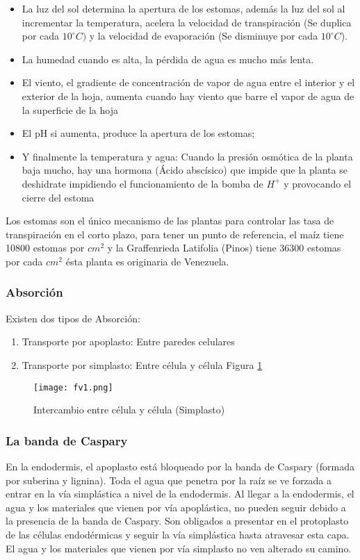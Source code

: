 \begin{itemize}
    \item La luz del sol determina la apertura de los estomas, además la luz del sol al incrementar la temperatura, acelera la velocidad de transpiración (Se duplica por cada $10^{\circ}C)$ y la velocidad de evaporación (Se disminuye por cada $10^{\circ}C$).
    \item La humedad cuando es alta, la pérdida de agua es mucho más lenta.
    \item El viento, el gradiente de concentración de vapor de agua entre el interior y el exterior de la hoja, aumenta cuando hay viento que barre el vapor de agua de la superficie de la hoja
    \item El pH si aumenta, produce la apertura de los estomas;
    \item Y finalmente la temperatura y agua: Cuando la presión osmótica de la planta baja mucho, hay una hormona (Ácido abscísico) 
    que impide que la planta se deshidrate impidiendo el funcionamiento de la bomba de $H^+$ y provocando el cierre del estoma
\end{itemize}

Los estomas son el único mecanismo de las plantas para controlar las tasa de transpiración en el corto plazo,
para tener un punto de referencia, el maíz tiene 10800 estomas por $cm^2$ y la Graffenrieda Latifolia (Pinos) tiene 36300 estomas por cada $cm^2$ ésta planta es originaria de Venezuela.
\subsubsection{Absorción}
Existen dos tipos de Absorción:

\begin{enumerate}
    \item Transporte por apoplasto: Entre paredes celulares
    \item Transporte por simplasto: Entre célula y célula Figura \ref{fav1}
\end{enumerate}

\begin{figure}[h!]
  \centerline{\texttt{[image: fv1.png]}}
  \caption{Intercambio entre célula y célula (Simplasto)}
  \label{fav1}
\end{figure}

\subsubsection{La banda de Caspary}
En la endodermis, el apoplasto está bloqueado por la banda de Caspary (formada por suberina y lignina). Toda el agua que penetra por la raíz se ve forzada a entrar en la vía simplástica a nivel de la endodermis.
Al llegar a la endodermis, el agua y los materiales que vienen por vía apoplástica, no pueden seguir debido a la presencia de la banda de Caspary. Son obligados a presentar en el protoplasto de las células endodérmicas y seguir la vía simplástica
hasta atravesar esta capa. El agua y los materiales que vienen por vía simplasto no ven alterado su camino.

